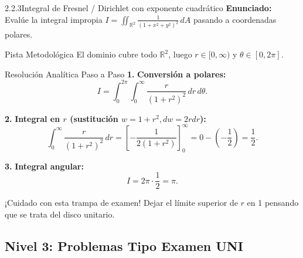 \documentclass[11pt,a4paper]{article}
\begin{document}
\begin{nivelbox}{2.2.3}{Integral de Fresnel / Dirichlet con exponente cuadrático}
\textbf{Enunciado:}\\
Evalúe la integral impropia $I = \iint_{\mathbb{R}^2} \frac{1}{(1 + x^2 + y^2)^2} \, dA$ pasando a coordenadas polares.

\begin{observacionbox}{Pista Metodológica}
El dominio cubre todo $\mathbb{R}^2$, luego $r \in [0, \infty)$ y $\theta \in [0, 2\pi]$.
\end{observacionbox}

\begin{ejerciciobox}{Resolución Analítica Paso a Paso}
\smallskip\noindent\textbf{1.} \textbf{Conversión a polares:}
\[I = \int_0^{2\pi} \int_0^\infty \frac{r}{(1 + r^2)^2} \, dr \, d\theta.\]

\smallskip\noindent\textbf{2.} \textbf{Integral en $r$ (sustitución $w = 1 + r^2, dw = 2r dr$):}
\[\int_0^\infty \frac{r}{(1 + r^2)^2} \, dr = \left[ -\frac{1}{2(1 + r^2)} \right]_0^\infty = 0 - \left( -\frac{1}{2} \right) = \frac{1}{2}.\]

\smallskip\noindent\textbf{3.} \textbf{Integral angular:}
\[I = 2\pi \cdot \frac{1}{2} = \pi.\]
\end{ejerciciobox}

\begin{errorbox}{¡Cuidado con esta trampa de examen!}
Dejar el límite superior de $r$ en 1 pensando que se trata del disco unitario.
\end{errorbox}
\end{nivelbox}
\bigskip

\subsection{Nivel 3: Problemas Tipo Examen UNI}
\end{document}

